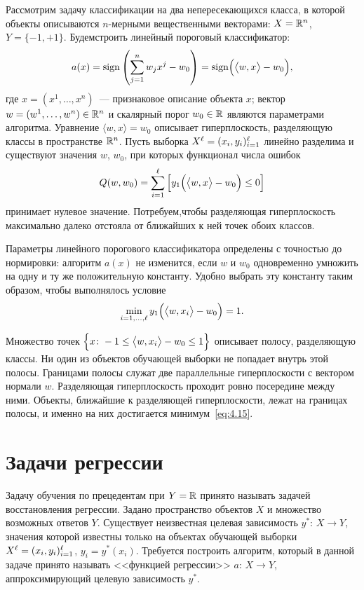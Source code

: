Рассмотрим задачу классификации на два непересекающихся класса, в которой объекты описываются
\( n \)-мерными вещественными векторами: \( X = \mathbb{R}^n \), \( Y = \{-1, +1\} \).
Будемстроить линейный пороговый классификатор:
\[
  a(x) = \mathrm{sign}\left(\sum_{j = 1}^n w_jx^j - w_0\right) = \mathrm{sign}\Bigl(\bigl\langle w, x\bigr\rangle - w_0\Bigr),
\]
где \( x = (x^1, \ldots, x^n) \)~--- признаковое описание объекта \( x \); вектор
\( w = (w^1, \ldots, w^n)\in\mathbb{R}^n \) и скалярный порог \( w_0\in\mathbb{R} \) являются параметрами алгоритма.
Уравнение \( \bigl\langle w, x\bigr\rangle = w_0 \) описывает гиперплоскость, разделяющую классы в
пространстве \( \mathbb{R}^n \). Пусть выборка \( X^\ell = (x_i, y_i)_{i = 1}^\ell \) линейно разделима и существуют
значения \( w \), \( w_0 \), при которых функционал числа ошибок
\[
  Q(w, w_0) = \sum_{i = 1}^\ell \left[y_1\Bigl(\bigl\langle w, x\bigr\rangle - w_0\Bigr)\le 0\right]
\]
принимает нулевое значение. Потребуем,чтобы разделяющая гиперплоскость максимально далеко отстояла от
ближайших к ней точек обоих классов.

Параметры линейного порогового классификатора определены с точностью до нормировки: алгоритм \( a(x) \)
не изменится, если \( w \) и \( w_0 \) одновременно умножить на одну и ту же положительную константу.
Удобно выбрать эту константу таким образом, чтобы выполнялось условие
\begin{equation}
  \min_{i = 1,\ldots,\ell}y_1\Bigl(\bigl\langle w, x_i\bigr\rangle - w_0\Bigr) = 1.
  \label{eq:4.15}
\end{equation}

Множество точек \( \Bigl\{ x\colon -1\le\bigl\langle w, x_i\bigr\rangle - w_0\le 1\Bigr\} \) описывает
полосу, разделяющую классы. Ни один из объектов обучающей выборки не попадает внутрь этой полосы.
Границами полосы служат две параллельные гиперплоскости с вектором нормали \( w \). Разделяющая
гиперплоскость проходит ровно посередине между ними. Объекты, ближайшие к разделяющей гиперплоскости,
лежат на границах полосы, и именно на них достигается минимум~\eqref{eq:4.15}.

\section{Задачи регрессии}
Задачу обучения по прецедентам при \( Y = \mathbb{R} \) принято называть задачей восстановления регрессии.
Задано пространство объектов \( X \) и множество возможных ответов \( Y \). Существует неизвестная
целевая зависимость \( y^* \): \( X\to Y \), значения которой известны только на объектах обучающей
выборки \( X^\ell = (x_i, y_i)^\ell_{i = 1} \), \( y_i = y^*(x_i) \). Требуется построить алгоритм, который
в данной задаче принято называть <<функцией регрессии>> \( a \): \( X\to Y \), аппроксимирующий целевую
зависимость \( y^* \).


